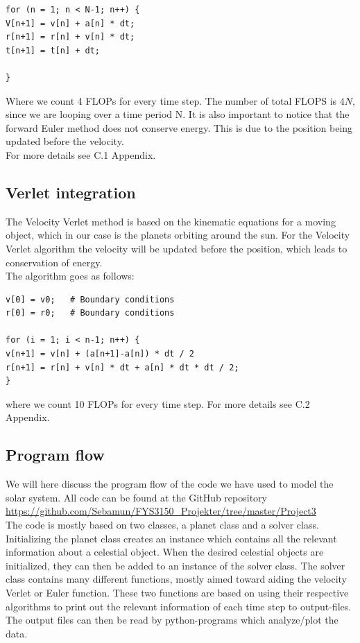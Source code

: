 \documentclass{article}
\begin{document}
\begin{multicols}{2}
\begin{verbatim}
for (n = 1; n < N-1; n++) {
V[n+1] = v[n] + a[n] * dt;
r[n+1] = r[n] + v[n] * dt;
t[n+1] = t[n] + dt;

}
\end{verbatim}
Where we count 4 FLOPs for every time step. The number of total FLOPS is $4N$, since we are looping over a time period N. It is also important to notice that the forward Euler method does not conserve energy. This is due to the position being updated before the velocity.  \\
For more details see C.1 Appendix.
\\
\subsection{Verlet integration}
The Velocity Verlet method is based on the kinematic equations for a moving object, which in our case is the planets orbiting around the sun. For the Velocity Verlet algorithm the velocity will be updated before the position, which leads to conservation of energy.\\   
The algorithm goes as follows:
\begin{verbatim}
v[0] = v0;   # Boundary conditions
r[0] = r0;   # Boundary conditions

for (i = 1; i < n-1; n++) {
v[n+1] = v[n] + (a[n+1]-a[n]) * dt / 2
r[n+1] = r[n] + v[n] * dt + a[n] * dt * dt / 2;
}

\end{verbatim}
where we count 10 FLOPs for every time step. 
For more details see C.2 Appendix.

\subsection{Program flow}

We will here discuss the program flow of the code we have used to model the solar system. All code can be found at the GitHub repository \\
\url{https://github.com/Sebamun/FYS3150_Projekter/tree/master/Project3}  \\ The code is mostly based on two classes, a planet class and a solver class. Initializing the planet class creates an instance which contains all the relevant information about a celestial object. When the desired celestial objects are initialized, they can then be added to an instance of the solver class. The solver class contains many different functions, mostly aimed toward aiding the velocity Verlet or Euler function. These two functions are based on using their respective algorithms to print out the relevant information of each time step to output-files. The output files can then be read by python-programs which analyze/plot the data.


\end{multicols}
\end{document}
